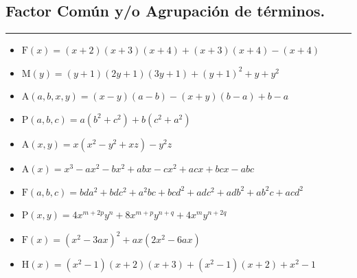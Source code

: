 \documentclass[12pt, a5paper]{article}
\begin{document}
\subsection*{Factor Común y/o Agrupación de términos.}
\hrule
\vspace{6pt}
\begin{itemize}
\item{$\mathrm{F}(x) = (x + 2)(x + 3)(x + 4) + (x + 3)(x + 4) - (x + 4)$}
\item{$\mathrm{M}(y) = (y + 1)(2y + 1)(3y + 1) + (y +1 )^2 + y + y^2$}
\item{$\mathrm{A}(a, b, x, y) = (x - y)(a - b) - (x + y)(b - a) + b - a$}
\item{$\mathrm{P}(a, b, c) = a(b^2 + c^2) + b(c^2 + a^2)$}
\item{$\mathrm{A}(x, y) = x(x^2 - y^2 + xz) - y^{2}z$}
\item{$\mathrm{A}(x) = x^3 - ax^2 - bx^2 + abx - cx^2 + acx + bcx - abc$}
\item{$\mathrm{F}(a,b,c) = bda^2 + bdc^2 + a^2bc + bcd^2 + adc^2 + adb^2 + ab^2c + acd^2$}
\item{$\mathrm{P}(x, y) = 4x^{m+2p}y^{n} + 8x^{m+p}y^{n+q} + 4x^{m}y^{n+2q}$}
\item{$\mathrm{F}(x) = (x^2 - 3ax)^2 + ax(2x^2 - 6ax)$}
\item{$\mathrm{H}(x) = (x^2 - 1)(x + 2)(x + 3) + (x^2 - 1)(x + 2) + x^2 - 1$}
\end{itemize}
\end{document}
